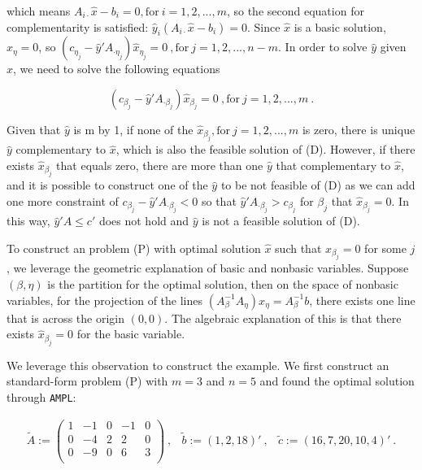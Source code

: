 which means $A_{i\cdot}\hat{x}-b_i = 0,\text{for}~i=1,2,...,m$, so the second equation for complementarity is satisfied: $\hat{y}_i(A_{i\cdot}\hat{x}-b_i) = 0$. Since $\hat{x}$ is a basic solution, $\hat{x}_{\eta} = 0$, so $(c_{\eta_j}-\hat{y}'A_{\cdot \eta_j})\hat{x}_{\eta_j} = 0~, \text{for}~j=1,2,...,n-m$. In order to solve $\hat{y}$ given $\hat{x}$, we need to solve the following equations

$$(c_{\beta_j}-\hat{y}'A_{\cdot \beta_j})\hat{x}_{\beta_j} = 0~, \text{for}~j=1,2,...,m~.$$

Given that $\hat{y}$ is m by 1, if none of the $\hat{x}_{\beta_j}, \text{for}~j=1,2,...,m$ is zero, there is unique $\hat{y}$ complementary to $\hat{x}$, which is also the feasible solution of (D). However, if there exists $\hat{x}_{\beta_j}$ that equals zero, there are more than one $\hat{y}$ that complementary to $\hat{x}$, and it is possible to construct one of the $\hat{y}$ to be not feasible of (D) as we can add one more constraint of $c_{\beta_j}-\hat{y}'A_{\cdot \beta_j} < 0$ so that $\hat{y}'A_{\cdot \beta_j} > c_{\beta_j}$ for $\beta_j$ that $\hat{x}_{\beta_j} = 0$. In this way, $\hat{y}'A \leq c'$ does not hold and $\hat{y}$ is not a feasible solution of (D).

To construct an problem (P) with optimal solution $\hat{x}$ such that $\hat{x}_{\beta_j} = 0$ for some $j$, we leverage the geometric explanation of basic and nonbasic variables. Suppose $(\beta, \eta)$ is the partition for the optimal solution, then on the space of nonbasic variables, for the projection of the lines $\left(A_\beta^{-1}A_\eta\right)x_\eta = A_\beta^{-1}b$, there exists one line that is across the origin $(0,0)$. The algebraic explanation of this is that there exists $\hat{x}_{\beta_j} = 0$ for the basic variable.

We leverage this observation to construct the example. We first construct an standard-form problem (P) with $m=3$ and $n=5$ and found the optimal solution through {\tt AMPL}:

\[
\begin{array}{ccc}
\tilde{A}  :=  \left(
  \begin{array}{ccccc}
    1 & -1 & 0 & -1 & 0  \\
    0 & -4 & 2 & 2 & 0 \\
    0 & -9 & 0 & 6 & 3\\
  \end{array}
\right)~, &
\tilde{b}  :=  (1,2,18)'~,&
\tilde{c}  :=  (16, 7, 20, 10, 4)'~.\\

\end{array}
\]

